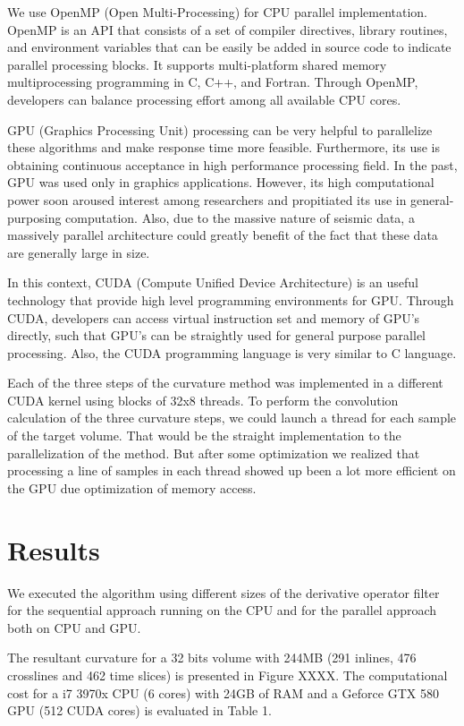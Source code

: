 \documentclass[conference]{IEEEtran}
\begin{document}
We use OpenMP (Open Multi-Processing) for CPU parallel implementation. OpenMP is an API that consists of a set of compiler directives, library routines, and environment variables that can be easily be added in source code to indicate parallel processing blocks. It supports multi-platform shared memory multiprocessing programming in C, C++, and Fortran. Through OpenMP, developers can balance processing effort among all available CPU cores.

GPU (Graphics Processing Unit) processing can be very helpful to parallelize these algorithms and make response time more feasible. Furthermore, its use is obtaining continuous acceptance in high performance processing field. In the past, GPU was used only in graphics applications. However, its high computational power soon aroused interest among researchers and propitiated its use in general-purposing computation. Also, due to the massive nature of seismic data, a massively parallel architecture could greatly benefit of the fact that these data are generally large in size.

In this context, CUDA (Compute Unified Device Architecture) is an useful technology that provide high level programming environments for GPU. Through CUDA, developers can access virtual instruction set and memory of GPU's directly, such that GPU's can be straightly used for general purpose parallel processing. Also, the CUDA programming language is very similar to C language.

Each of the three steps of the curvature method was implemented in a different CUDA kernel using blocks of 32x8 threads. To perform the convolution calculation of the three curvature steps, we could launch a thread for each sample of the target volume. That would be the straight implementation to the parallelization of the method. But after some optimization we realized that processing a line of samples in each thread showed up been a lot more efficient on the GPU due optimization of memory access.

\section{Results}
We executed the algorithm using different sizes of the derivative operator filter for the sequential approach running on the CPU and for the parallel approach both on CPU and GPU.

The resultant curvature for a 32 bits volume with 244MB (291 inlines, 476 crosslines and 462 time slices) is presented in Figure XXXX. The computational cost for a i7 3970x CPU (6 cores) with 24GB of RAM and a Geforce GTX 580 GPU (512 CUDA cores) is evaluated in Table 1.
\end{document}
